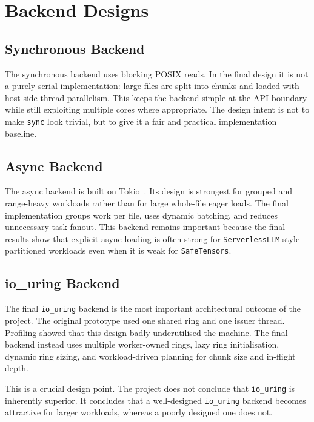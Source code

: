 \section{Backend Designs}

\subsection{Synchronous Backend}

The synchronous backend uses blocking POSIX reads. In the final design it is not a purely serial implementation: large files are split into chunks and loaded with host-side thread parallelism. This keeps the backend simple at the API boundary while still exploiting multiple cores where appropriate. The design intent is not to make \texttt{sync} look trivial, but to give it a fair and practical implementation baseline.

\subsection{Async Backend}

The async backend is built on Tokio~\cite{tokio_docs,tokio_repo}. Its design is strongest for grouped and range-heavy workloads rather than for large whole-file eager loads. The final implementation groups work per file, uses dynamic batching, and reduces unnecessary task fanout. This backend remains important because the final results show that explicit async loading is often strong for \texttt{ServerlessLLM}-style partitioned workloads even when it is weak for \texttt{SafeTensors}.

\subsection{io\_uring Backend}

The final \texttt{io\_uring} backend is the most important architectural outcome of the project. The original prototype used one shared ring and one issuer thread. Profiling showed that this design badly underutilised the machine. The final backend instead uses multiple worker-owned rings, lazy ring initialisation, dynamic ring sizing, and workload-driven planning for chunk size and in-flight depth.

This is a crucial design point. The project does not conclude that \texttt{io\_uring} is inherently superior. It concludes that a well-designed \texttt{io\_uring} backend becomes attractive for larger workloads, whereas a poorly designed one does not.

